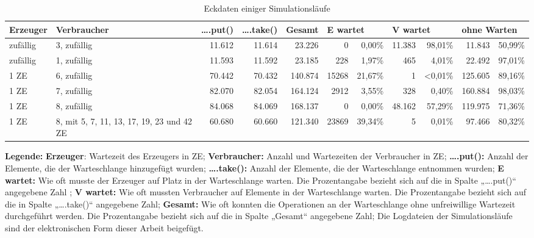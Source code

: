 \begin{landscape}
\begin{footnotesize}
\begin{table}[H]
\begin{center}
\begin{tabular}{| p{3cm} | p{3cm} || r | r | r | r r | r r | r r |}  \hline                       
  \textbf{Erzeuger}	& \textbf{Verbraucher}  & \textbf{….put()} & \textbf{….take()} & \textbf{Gesamt} & \multicolumn{2}{|l|}{\textbf{E wartet}} & \multicolumn{2}{|l|}{\textbf{V wartet}} & \multicolumn{2}{|l|}{\textbf{ohne Warten}}  \\ \hline 
zufällig 		& 3, zufällig & 11.612 			 & 11.614 			 & 23.226 		   & 0 		 & 0,00\% 						 & 11.383  & 98,01\% 					   & 11.843		&	50,99\%	\\ \hline
zufällig 		& 1, zufällig & 11.593		     & 11.592 			 & 23.185 		   & 228 	 & 1,97\% 						 & 465     &  4,01\% 					   & 22.492		&	97,01\%	\\ \hline
1 ZE 			& 6, zufällig & 70.442 	 	     & 70.432 			 & 140.874 		   & 15268 	 & 21,67\% 						 & 1       &  <0,01\% 					   & 125.605	&  89,16\%	\\ \hline
1 ZE 			& 7, zufällig & 82.070 	 		 & 82.054 			 & 164.124 		   & 2912    & 3,55\% 						 & 328     & 0,40\% 					   & 160.884		&	98,03\%	\\ \hline
1 ZE 			& 8, zufällig & 84.068 	 		 & 84.069 			 & 168.137 		   & 0 	 & 0,00\% 						 & 48.162  & 57,29\% 					   & 119.975	&	71,36\%	\\ \hline
1 ZE & 8, mit 5, 7, 11, 13, 17, 19, 23 und 42 ZE & 60.680 & 60.660	 & 121.340 		   & 23869 		 & 39,34\% 						 & 5  & 0,01\% 					   & 97.466		&	80,32\%	\\ \hline
\end{tabular}
\caption{Eckdaten einiger Simulationsläufe}
\label{tab:ergebnisse}
\end{center}
\end{table}
\textbf{Legende:} \textbf{Erzeuger}: Wartezeit des Erzeugers in \ac{ZE}; \textbf{Verbraucher:} Anzahl und Wartezeiten der Verbraucher in \ac{ZE}; \textbf{….put():} Anzahl der Elemente, die der Warteschlange hinzugefügt wurden; \textbf{….take():} Anzahl der Elemente, die der Warteschlange entnommen wurden; \textbf{E wartet:} Wie oft musste der Erzeuger auf Platz in der Warteschlange warten. Die Prozentangabe bezieht sich auf die in Spalte „….put()“ angegebene Zahl ; \textbf{V wartet:} Wie oft mussten Verbraucher auf Elemente in der Warteschlange warten. Die Prozentangabe bezieht sich auf die in Spalte „….take()“ angegebene Zahl; \textbf{Gesamt:} Wie oft konnten die Operationen an der Warteschlange ohne unfreiwillige Wartezeit durchgeführt werden. Die Prozentangabe bezieht sich auf die in Spalte „Gesamt“ angegebene Zahl; Die Logdateien der Simulationsläufe sind der elektronischen Form dieser Arbeit beigefügt.
\end{footnotesize}
\end{landscape}

